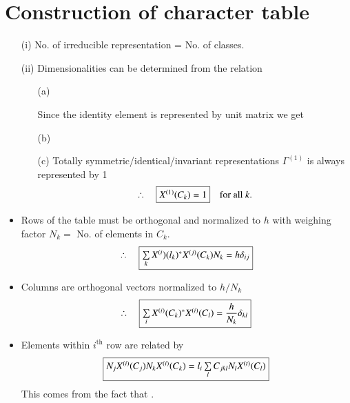 \section*{Construction of character table}

\begin{itemize}
\item[(i)] No. of irreducible representation = No. of classes.

\item[(ii)] Dimensionalities can be determined from the relation
\begin{itemize}
\item[(a)] 

Since the identity element is represented by unit matrix we get

\item[(b)] 

\item[(c)] Totally symmetric/identical/invariant representations $\Gamma^{(1)}$ is always represented by 1
$$
\therefore\quad \fbox{$X^{(1)}(C_{k})=1$}\quad\text{for all } k.
$$
\end{itemize}

\item Rows of the table must be orthogonal and normalized to $h$ with weighing factor $N_{k}=$ No. of elements in $C_{k}$.
$$
\therefore\quad \fbox{$\sum\limits_{k}X^{(i})(l_{k})^{*}X^{(j)}(C_{k})N_{k}=h\delta_{ij}$}
$$

\item Columns are orthogonal vectors normalized to $h/N_{k}$
$$
\therefore\quad \fbox{$\sum\limits_{i}X^{(i)}(C_{k})^{*}X^{(i)}(C_{l})=\dfrac{h}{N_{k}}\delta_{kl}$}
$$

\item Elements within $i^{\text{th}}$ row are related by
$$
\fbox{$N_{j}X^{(i)}(C_{j})N_{k}X^{(i)}(C_{k})=l_{i}\sum\limits_{l}C_{jkl}N_{l}X^{(t)}(C_{l})$}
$$
This comes from the fact that .
\end{itemize}

